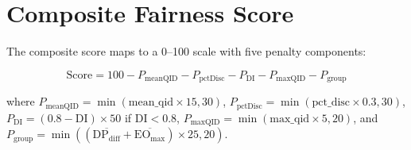 \section{Composite Fairness Score}

The composite score maps to a 0--100 scale with five penalty components:

\begin{equation}
    \text{Score} = 100 - P_{\text{meanQID}} - P_{\text{pctDisc}} - P_{\text{DI}} - P_{\text{maxQID}} - P_{\text{group}}
    \label{eq:score}
\end{equation}

where $P_{\text{meanQID}} = \min(\text{mean\_qid} \times 15, 30)$, $P_{\text{pctDisc}} = \min(\text{pct\_disc} \times 0.3, 30)$, $P_{\text{DI}} = (0.8 - \text{DI}) \times 50$ if $\text{DI} < 0.8$, $P_{\text{maxQID}} = \min(\text{max\_qid} \times 5, 20)$, and $P_{\text{group}} = \min((\overline{\text{DP}_{\text{diff}}} + \overline{\text{EO}_{\max}}) \times 25, 20)$.
